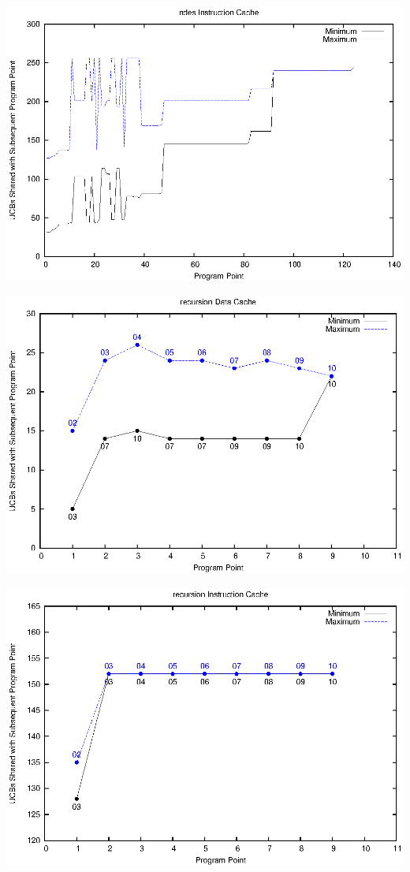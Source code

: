\begin{center}
  \includegraphics[width=\linewidth]{eps/ndes-icache.eps}
\end{center}

\begin{center}
  \includegraphics[width=\linewidth]{eps/recursion-dcache.eps}
\end{center}

\begin{center}
  \includegraphics[width=\linewidth]{eps/recursion-icache.eps}
\end{center}

